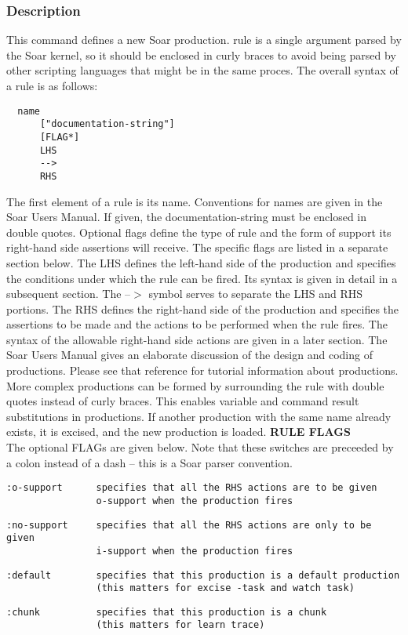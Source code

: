\subsubsection*{Description}
 This command defines a new Soar production. rule is a single argument parsed by the Soar kernel, so it should be enclosed in curly braces to avoid being parsed by other scripting languages that might be in the same proces. The overall syntax of a rule is as follows: \begin{verbatim}
  name 
      ["documentation-string"] 
      [FLAG*]
      LHS
      -->
      RHS
\end{verbatim}
 The first element of a rule is its name. Conventions for names are given in the Soar Users Manual. If given, the documentation-string must be enclosed in double quotes. Optional flags define the type of rule and the form of support its right-hand side assertions will receive. The specific flags are listed in a separate section below. The LHS defines the left-hand side of the production and specifies the conditions under which the rule can be fired. Its syntax is given in detail in a subsequent section. The --$>$ symbol serves to separate the LHS and RHS portions. The RHS defines the right-hand side of the production and specifies the assertions to be made and the actions to be performed when the rule fires. The syntax of the allowable right-hand side actions are given in a later section. The Soar Users Manual gives an elaborate discussion of the design and coding of productions. Please see that reference for tutorial information about productions. 
  More complex productions can be formed by surrounding the rule with double quotes instead of curly braces. This enables variable and command result substitutions in productions. If another production with the same name already exists, it is excised, and the new production is loaded. 
 \textbf{RULE FLAGS}
\\ 
 The optional FLAGs are given below. Note that these switches are preceeded by a colon instead of a dash -- this is a Soar parser convention. \begin{verbatim}
:o-support      specifies that all the RHS actions are to be given
                o-support when the production fires 
\end{verbatim}
 \begin{verbatim}
:no-support     specifies that all the RHS actions are only to be given
                i-support when the production fires 
\end{verbatim}
 \begin{verbatim}
:default        specifies that this production is a default production 
                (this matters for excise -task and watch task) 
\end{verbatim}
 \begin{verbatim}
:chunk          specifies that this production is a chunk 
                (this matters for learn trace)
\end{verbatim}
